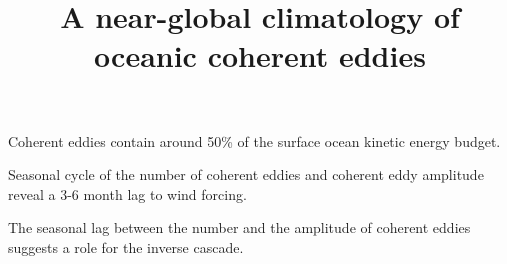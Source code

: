 \documentclass[draft,linenumbers]{agujournal2019}
\begin{document}
\title{A near-global climatology of oceanic coherent eddies}



\begin{keypoints}
	\item Coherent eddies 
	contain around 50\% of the 
	surface ocean kinetic energy budget.
	\item Seasonal cycle of the number of coherent eddies and 
	coherent eddy amplitude reveal a 3-6 month lag to wind forcing.
	\item The seasonal lag between the number and 
	the amplitude of coherent eddies suggests a role for the inverse cascade.
\end{keypoints}
\end{document}
